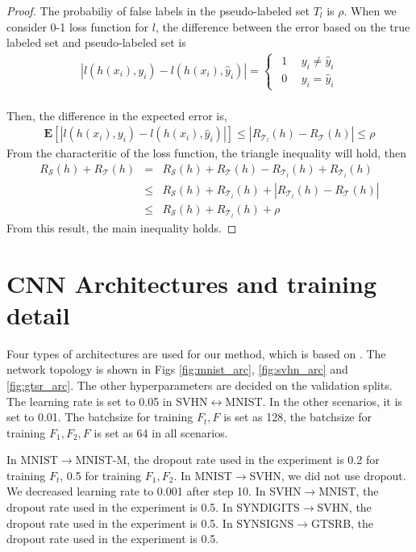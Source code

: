 \documentclass{article}
\begin{document}
\begin{proof}
  The probabiliy of false labels in the pseudo-labeled set $T_{l}$ is $\rho$.
  When we consider 0-1 loss function for $l$, the difference between the error based on the true labeled set and pseudo-labeled set is
  \begin{eqnarray}
    |l(h(x_i),y_i) - l(h(x_i),\hat y_i)|=\begin{cases}
    \ \ 1 \ \ & y_i\neq \hat y_i\\\nonumber
    \ \ 0 \ \ & y_i = \hat y_i
    \end{cases}
  \end{eqnarray}\\
      Then, the difference in the expected error is,
  \begin{eqnarray}
    {\mathbf{E}}[|l(h(x_i),y_i) - l(h(x_i),\hat y_i)|]
    \leq |R_{\mathcal{T}_l}(h) -R_{\mathcal{T}}(h)| \leq \rho \nonumber
\end{eqnarray}
  From the characteritic of the loss function, the triangle inequality will hold, then
  \begin{eqnarray}
    \nonumber
    R_{\mathcal{S}}(h) + R_{\mathcal{T}}(h)&=&R_{\mathcal{S}}(h) + R_{\mathcal{T}}(h) - R_{\mathcal{T}_{l}}(h) + R_{\mathcal{T}_{l}}(h) \\\nonumber
    &\leq& R_{\mathcal{S}}(h) + R_{\mathcal{T}_l}(h) +|R_{\mathcal{T}_l}(h) -R_{\mathcal{T}}(h)|\\\nonumber
    &\leq& R_{\mathcal{S}}(h) + R_{\mathcal{T}_{l}}(h) + \rho \nonumber
  \end{eqnarray}
  From this result, the main inequality holds.
 \end{proof}

\section*{CNN Architectures and training detail}
Four types of architectures are used for our method, which is based on \cite{ganin2014unsupervised}. The network topology is shown in Figs \ref{fig:mnist_arc}, \ref{fig:svhn_arc} and \ref{fig:gtsr_arc}. The other hyperparameters are decided on the validation splits. The learning rate is set to 0.05 in SVHN$\leftrightarrow$MNIST. In the other scenarios, it is set to 0.01. The batchsize for training $F_t,F$ is set as 128, the batchsize for training $F_1,F_2,F$ is set as 64 in all scenarios.

In MNIST$\rightarrow$MNIST-M, the dropout rate used in the experiment is 0.2 for training $F_t$, 0.5 for training $F_1,F_2$.
In MNIST$\rightarrow$SVHN, we did not use dropout. We decreased learning rate to 0.001 after step 10.
In SVHN$\rightarrow$MNIST, the dropout rate used in the experiment is 0.5.
In SYNDIGITS$\rightarrow$SVHN, the dropout rate used in the experiment is 0.5.
In SYNSIGNS$\rightarrow$GTSRB, the dropout rate used in the experiment is 0.5.
\end{document}
